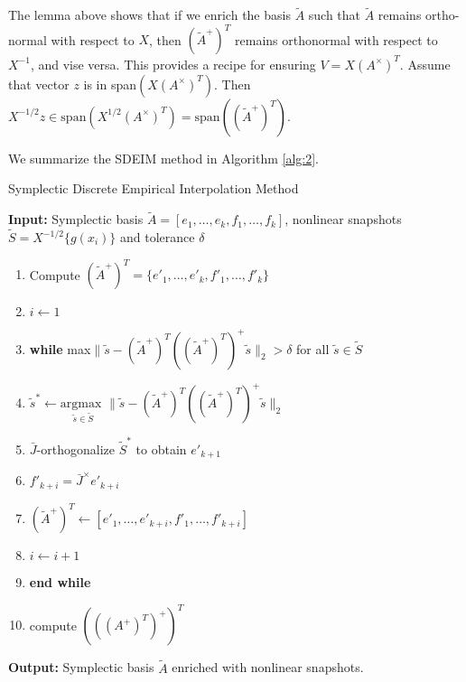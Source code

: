 \documentclass[12pt]{article}
\begin{document}
The lemma above shows that if we enrich the basis $\tilde A$ such that $\tilde A$ remains ortho-normal with respect to $X$, then $(\tilde A ^+)^T$ remains orthonormal with respect to $X^{-1}$, and vise versa. This provides a recipe for ensuring $V = X (A^{\times})^T$. Assume that vector $z$ is in span$\left( X( A^{\times})^T\right)$. Then $X^{-1/2}z \in \text{span}\left(X^{1/2} (A^{\times})^T\right) = \text{span}\left( (\tilde A^+)^T\right)$.

We summarize the SDEIM method in Algorithm \ref{alg:2}.


\begin{algorithm} 
\caption{Symplectic Discrete Empirical Interpolation Method} \label{alg:2}
{\bf Input:} Symplectic basis $\tilde A=[  e_1,\dots,e_k,f_1,\dots,f_k ]$, nonlinear snapshots $\tilde S = X^{-1/2}\{ g( x_i ) \}$ and tolerance $\delta$
\begin{enumerate}
\item Compute $(\tilde A^+)^T = \{ e'_1,\dots,e'_k,f'_1,\dots,f'_k \}$
\item $i \leftarrow 1$
\item \textbf{while} max$\| \tilde s - (\tilde A^+)^T ((\tilde A^+)^T)^+\tilde s \|_2 > \delta$ for all $\tilde s\in \tilde S$
\item \hspace{0.5cm} $\tilde s^* \leftarrow \underset{\tilde s \in \tilde S}{\text{argmax }}\| \tilde s - (\tilde A^+)^T ((\tilde A^+)^T)^+ \tilde s \|_2$
\item \hspace{0.5cm} $\bar J$-orthogonalize $ \tilde S^*$ to obtain $e'_{k+1}$ 
\item \hspace{0.5cm} $f'_{k+i} = \bar J^{\times} e'_{k+i}$
\item \hspace{0.5cm} $(\tilde A^+)^T \leftarrow [e'_1,\dots,e'_{k+i},f'_1,\dots,f'_{k+i}]$
\item \hspace{0.5cm} $i\leftarrow i+1$
\item \textbf{end while}
\item compute $(((A^+)^T)^+)^T$
\end{enumerate}
\vspace{0.5cm}
{\bf Output:} Symplectic basis $\tilde A$ enriched with nonlinear snapshots.
\end{algorithm}
\end{document}
